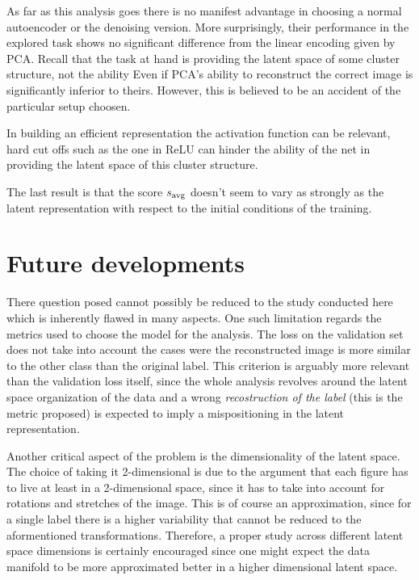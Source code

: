 \documentclass[twocolumn,gsifonts,twoside]{gsipaper}
\begin{document}
As far as this analysis goes there is no manifest advantage in choosing a normal autoencoder or the denoising version. More surprisingly, their performance in the explored task shows no significant difference from the linear encoding given by PCA. Recall that the task at hand is providing the latent space of some cluster structure, not the ability Even if PCA's ability to reconstruct the correct image is significantly inferior to theirs. However, this is believed to be an accident of the particular setup choosen.

In building an efficient representation the activation function can be relevant, hard cut offs such as the one in ReLU can hinder the ability of the net in providing the latent space of this cluster structure. 


The last result is that the score $s_\textup{avg}$ doesn't seem to vary as strongly as the latent representation with respect to the initial conditions of the training.

\section{Future developments}
There question posed cannot possibly be reduced to the study conducted here which is inherently flawed in many aspects. One such limitation regards the metrics used to choose the model for the analysis. The loss on the validation set does not take into account the cases were the reconstructed image is more similar to the other class than the original label. This criterion is arguably more relevant than the validation loss itself, since the whole analysis revolves around the latent space organization of the data and a wrong \emph{recostruction of the label} (this is the metric proposed) is expected to imply a mispositioning in the latent representation.

Another critical aspect of the problem is the dimensionality of the latent space. The choice of taking it 2-dimensional is due to the argument that each figure has to live at least in a 2-dimensional space, since it has to take into account for rotations and stretches of the image. This is of course an approximation, since for a single label there is a higher variability that cannot be reduced to the aformentioned transformations. Therefore, a proper study across different latent space dimensions is certainly encouraged since one might expect the data manifold to be more approximated better in a higher dimensional latent space.
\end{document}

